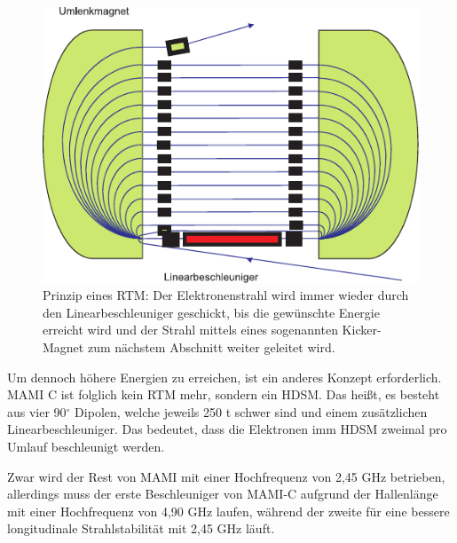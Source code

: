 \documentclass[a4paper,11pt,oneside,final,german,openbib,pdftex]{scrbook}
\begin{document}
{\begin{figure}[h!]
	\begin{center}
	\includegraphics{RTM}	
	\caption[Prinzip eines RTM]{Prinzip eines RTM: Der Elektronenstrahl wird immer wieder durch den Linearbeschleuniger geschickt, bis die gew\"unschte Energie erreicht wird und der Strahl mittels eines sogenannten Kicker-Magnet zum n\"achstem Abschnitt weiter geleitet wird.\cite{KPh07} }
	\label{fig.RTM}
\end{center}
\end{figure}

Um dennoch höhere Energien zu erreichen, ist ein anderes Konzept erforderlich. MAMI C ist folglich kein RTM mehr, sondern ein HDSM. Das hei{\ss}t, es besteht aus vier 90$^{\circ}$ Dipolen, welche jeweils 250 t schwer sind und einem zus\"atzlichen Linearbeschleuniger. 
Das bedeutet, dass die Elektronen imm HDSM zweimal pro Umlauf beschleunigt werden.

Zwar wird der Rest von MAMI mit einer Hochfrequenz von 2,45 GHz betrieben, allerdings muss der erste Beschleuniger von MAMI-C aufgrund der Hallenl\"ange mit einer Hochfrequenz von 4,90 GHz laufen, w\"ahrend der zweite f\"ur eine bessere longitudinale Strahlstabilit\"at mit 2,45 GHz l\"auft. \cite{Ca10}

\begin{table}[h!]
\centering



\end{table}}
\end{document}
